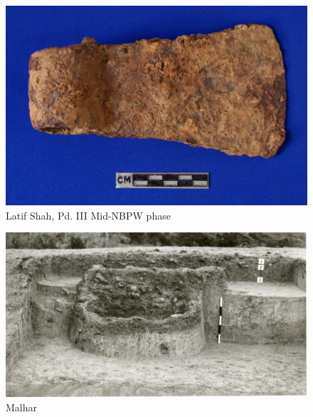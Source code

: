 \begin{figure}[H]
\renewcommand{\thefigure}{13B}
\includegraphics[scale=0.75]{images/chapter-4/fig013B.jpg}
\caption{Latif Shah, Pd. III Mid-NBPW phase}\label{chapter-4-fig13B}
\end{figure}

\newpage

\begin{figure}[H]
\setcounter{figure}{13}
\includegraphics[scale=0.75]{images/chapter-4/fig014.jpg}
\caption{Malhar}\label{chapter-4-fig14}
\end{figure}


